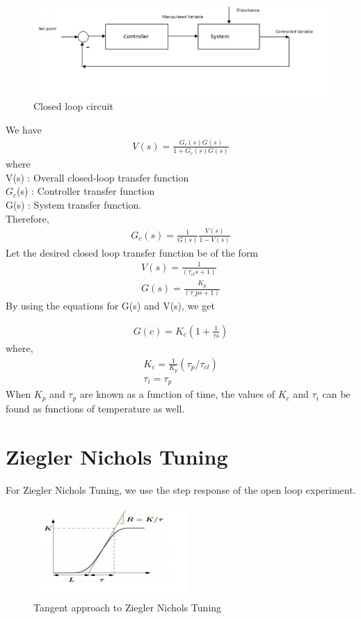 \begin{figure}[h]
	\centering
		\includegraphics[scale = 20,width = 1\linewidth]{Vikas_self/report_tex/Closed Loop Circuit.jpg}
	\caption{Closed loop circuit}
\end{figure}
We have
\begin{align}
V(s) = \frac {G_c(s) G(s)}{1+G_c(s) G(s)}
\end{align}
where\\
V(s) : Overall closed-loop transfer function\\
$G_c$(s) : Controller transfer function\\
G(s) : System transfer function.\\
Therefore,
\begin{align}
G_c(s) = \frac 1{G(s)} \frac {V(s)}{1-V(s)}
\end{align}
Let the desired closed loop transfer function be of the form
\begin{align}
V(s)=\frac 1{(\tau_{cl}s+1)}\\
G(s)=\frac {K_p}{(\tau\_p s+1)}
\end{align}
By using the equations for G(s) and V(s), we get

\begin{align}
G(c)=K_c(1 + \frac {1}{\tau s})
\end{align}
where,\\
\begin{align}
K_c = \frac 1{K_p} (\tau_p / \tau_{cl} )\\
\tau_i = \tau_p
\end{align}
When $K_p$ and $\tau_p$ are known as a function of time, the values of $K_c$ and $\tau_i$ can be found as functions of 
temperature as well.
\newpage
\section{Ziegler Nichols Tuning}
For Ziegler Nichols Tuning, we use the step response of the open loop experiment.

\begin{figure}[h]
	\centering
\includegraphics[width = 0.7\linewidth]{Vikas_self/report_tex/ziegler.jpg}
	\caption{Tangent approach to Ziegler Nichols Tuning}
	\label{ziegler}
\end{figure}

